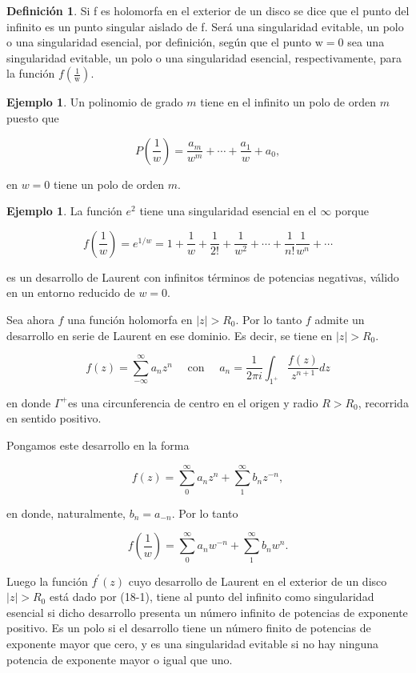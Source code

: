 \documentclass[10pt]{article}
\theoremstyle{plain}
\theoremstyle{definition}
\newtheorem{definition}[theorem]{Definición}
\newtheorem{example}[theorem]{Ejemplo}
\theoremstyle{remark}
\begin{document}
\begin{definition}
Si f es holomorfa en el exterior de un disco se dice que el punto del infinito es un punto singular aislado de f. Será una singularidad evitable, un polo o una singularidad esencial, por definición, según que el punto $\mathrm{w}=0$ sea una singularidad evitable, un polo o una singularidad esencial, respectivamente, para la función $f\left(\frac{1}{\mathrm{w}}\right)$.  
\end{definition}


\begin{example}
Un polinomio de grado $m$ tiene en el infinito un polo de orden $m$ puesto que

$$
P\left(\frac{1}{w}\right)=\frac{a_{m}}{w^{m}}+\cdots+\frac{a_{1}}{w}+a_{0},
$$

en $w=0$ tiene un polo de orden $m$.  
\end{example}

\begin{example}
  La función $e^{2}$ tiene una singularidad esencial en el $\infty$ porque

$$
f\left(\frac{1}{w}\right)=e^{1 / w}=1+\frac{1}{w}+\frac{1}{2!}+\frac{1}{w^{2}}+\cdots+\frac{1}{n!} \frac{1}{w^{n}}+\cdots
$$

es un desarrollo de Laurent con infinitos términos de potencias negativas, válido en un entorno reducido de $w=0$.
\end{example}

Sea ahora $f$ una función holomorfa en $|z|>R_{0}$. Por lo tanto $f$ admite un desarrollo en serie de Laurent en ese dominio. Es decir, se tiene en $|z|>R_{0}$.

$$
f(z)=\sum_{-\infty}^{\infty} a_{n} z^{n} \quad \text { con } \quad a_{n}=\frac{1}{2 \pi i} \int_{1^{+}} \frac{f(z)}{z^{n+1}} d z
$$

en donde $\Gamma^{+}$es una circunferencia de centro en el origen y radio $R>R_{0}$, recorrida en sentido positivo.

Pongamos este desarrollo en la forma


\begin{equation*}
f(z)=\sum_{0}^{\infty} a_{n} z^{n}+\sum_{1}^{\infty} b_{n} z^{-n}, \tag{18-1}
\end{equation*}


en donde, naturalmente, $b_{n}=a_{-n}$. Por lo tanto

$$
f\left(\frac{1}{w}\right)=\sum_{0}^{\infty} a_{n} w^{-n}+\sum_{1}^{\infty} b_{n} w^{n} .
$$

Luego la función $f^{\prime}(z)$ cuyo desarrollo de Laurent en el exterior de un disco $|z|>R_{0}$ está dado por (18-1), tiene al punto del infinito como singularidad esencial si dicho desarrollo presenta un número infinito de potencias de exponente positivo. Es un polo si el desarrollo tiene un número finito de potencias de exponente mayor que cero, y es una singularidad evitable si no hay ninguna potencia de exponente mayor o igual que uno.
\end{document}

